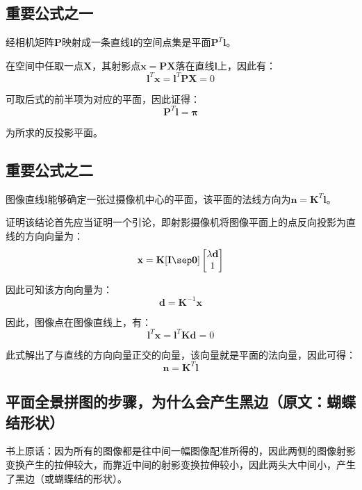 \documentclass[11pt]{article}
\begin{document}
\subsection{重要公式之一}
{\heiti 经相机矩阵$\mathbf{P}$映射成一条直线$\mathbf{l}$的空间点集是平面$\mathbf{P}^T\mathbf{l}$}。\par
{}\par
在空间中任取一点$\mathbf{X}$，其射影点$\mathbf{x=PX}$落在直线$\mathbf{l}$上，因此有：
\begin{equation*}
  \mathbf{l}^T\mathbf{x}=\mathbf{l}^T\mathbf{PX}=0
\end{equation*}\par
可取后式的前半项为对应的平面，因此证得：
\begin{equation*}
  \mathbf{P}^T\mathbf{l}=\mathbold{\pi}
\end{equation*}\par
为所求的反投影平面。
\subsection{重要公式之二}
{\heiti 图像直线$\mathbf{l}$能够确定一张过摄像机中心的平面，该平面的法线方向为$\mathbf{n=K^\mathit{T}l}$}。\par
{}\par
证明该结论首先应当证明一个引论，即射影摄像机将图像平面上的点反向投影为直线的方向向量为：
\begin{equation*}
  \mathbf{x}=\mathbf{K[I\sep 0]}\begin{bmatrix}
    \lambda\mathbf{d} \\1
  \end{bmatrix}
\end{equation*}\par
因此可知该方向向量为：
\begin{equation*}
  \mathbf{d}=\mathbf{K}^{-1}\mathbf{x}
\end{equation*}\par
因此，图像点在图像直线上，有：
\begin{equation*}
  \mathbf{l^\mathit{T}x}=\mathbf{l^\mathit{T}K}\mathbf{d}=0
\end{equation*}\par
此式解出了与直线的方向向量正交的向量，该向量就是平面的法向量，因此可得：
\begin{equation*}
  \mathbf{n}=\mathbf{K}^T\mathbf{l}
\end{equation*}\par
\subsection{平面全景拼图的步骤，为什么会产生黑边（原文：蝴蝶结形状）}
\label{subsec:平面全景拼图的步骤，为什么会产生黑边（原文：蝴蝶结形状）}
书上原话：因为所有的图像都是往中间一幅图像配准所得的，因此两侧的图像射影变换产生的拉伸较大，而靠近中间的射影变换拉伸较小，因此两头大中间小，产生了黑边（或蝴蝶结的形状）。
\end{document}

